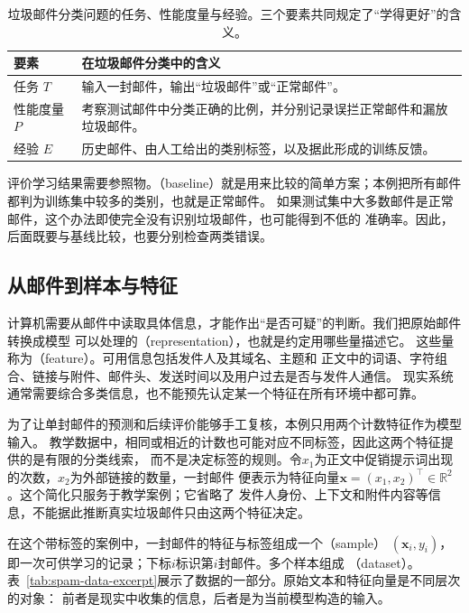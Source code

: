 \begin{table}[htbp]
  \centering
  \small
  \begin{tabularx}{\linewidth}{@{}lX@{}}
    \toprule
    \textbf{要素} & \textbf{在垃圾邮件分类中的含义} \\
    \midrule
    任务 $T$ & 输入一封邮件，输出“垃圾邮件”或“正常邮件”。 \\
    性能度量 $P$ & 考察测试邮件中分类正确的比例，并分别记录误拦正常邮件和漏放垃圾邮件。 \\
    经验 $E$ & 历史邮件、由人工给出的类别标签，以及据此形成的训练反馈。 \\
    \bottomrule
  \end{tabularx}
  \caption{垃圾邮件分类问题的任务、性能度量与经验。三个要素共同规定了“学得更好”的含义。}
  \label{tab:spam-three-elements}
\end{table}

评价学习结果需要参照物。（baseline）就是用来比较的简单方案；本例把所有邮件
都判为训练集中较多的类别，也就是正常邮件。
如果测试集中大多数邮件是正常邮件，这个办法即使完全没有识别垃圾邮件，也可能得到不低的
准确率。因此，后面既要与基线比较，也要分别检查两类错误。

\subsection{从邮件到样本与特征}

计算机需要从邮件中读取具体信息，才能作出“是否可疑”的判断。我们把原始邮件转换成模型
可以处理的（representation），也就是约定用哪些量描述它。
这些量称为（feature）。可用信息包括发件人及其域名、主题和
正文中的词语、字符组合、链接与附件、邮件头、发送时间以及用户过去是否与发件人通信。
现实系统通常需要综合多类信息，也不能预先认定某一个特征在所有环境中都可靠。

为了让单封邮件的预测和后续评价能够手工复核，本例只用两个计数特征作为模型输入。
教学数据中，相同或相近的计数也可能对应不同标签，因此这两个特征提供的是有限的分类线索，
而不是决定标签的规则。令$x_1$为正文中促销提示词出现的次数，$x_2$为外部链接的数量，一封邮件
便表示为特征向量$\bm{x}=(x_1,x_2)^{\top}\in\mathbb{R}^{2}$。这个简化只服务于教学案例；它省略了
发件人身份、上下文和附件内容等信息，不能据此推断真实垃圾邮件只由这两个特征决定。

在这个带标签的案例中，一封邮件的特征与标签组成一个（sample）
$(\bm{x}_i,y_i)$，即一次可供学习的记录；下标$i$标识第$i$封邮件。多个样本组成
（dataset）。
表~\ref{tab:spam-data-excerpt}展示了数据的一部分。原始文本和特征向量是不同层次的对象：
前者是现实中收集的信息，后者是为当前模型构造的输入。


